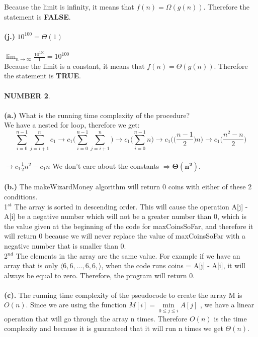 \documentclass[10pt]{article}
\begin{document}
Because the limit is infinity, it means that $f(n) = \Omega(g(n))$. Therefore the statement is \textbf{FALSE}.\\\\
\textbf{(j.)} $10^{100}= \Theta(1)$\\\\
$\displaystyle \lim_{n\to \infty} \displaystyle \frac{10^{100}}{1} = 10^{100}$\\
Because the limit is a constant, it means that $f(n) = \Theta(g(n))$. Therefore the statement is \textbf{TRUE}.\\\\
\textbf{NUMBER 2}.\\\\
\textbf{(a.)} What is the running time complexity of the procedure?\\
We have a nested for loop, therefore we get:
$$\sum_{i=0}^{n-1} \sum_{j=i+1}^{n} c_1 \rightarrow c_1\Big(\sum_{i=0}^{n-1} \sum_{j=i+1}^{n} \Big) \rightarrow c_1\Big(\sum_{i=0}^{n-1} n\Big) \rightarrow c_1\Big(\Big(\frac{n-1}{2}\Big)n \Big) \rightarrow c_1\Big(\frac{n^2-n}{2}\Big)$$\\
$ \rightarrow c_1\frac{1}{2} n^2 - c_1 n$ We don't care about the constants $\Rightarrow \mathbf{\Theta(n^2)}$.\\\\
\textbf{(b.)} The makeWizardMoney algorithm will return 0 coins with either of these 2 conditions. \\
1$^{st}$ The array is sorted in descending order. This will cause the operation A[j] - A[i] be a negative number which will not be a greater number than 0, which is the value given at the beginning of the code for maxCoinsSoFar, and therefore it will return 0 because we will never replace the value of maxCoinsSoFar with a negative number that is smaller than 0. \\ 2$^{nd}$ The elements in the array are the same value. For example if we have an array that is only $\langle 6,6, ... ,6,6, \rangle$, when the code runs coins = A[j] - A[i], it will always be equal to zero. Therefore, the program will return 0.\\\\
\textbf{(c).}  The running time complexity of the pseudocode to create the array M is $O(n)$. Since we are using the function $M[i] =  \underset{0\leqslant j \leqslant i}{\operatorname{min}} A[j]$ , we have a linear operation that will go through the array n times. Therefore $O(n)$ is the time complexity and because it is guaranteed that it will run n times we get $\Theta(n)$.\\\\
\end{document}

